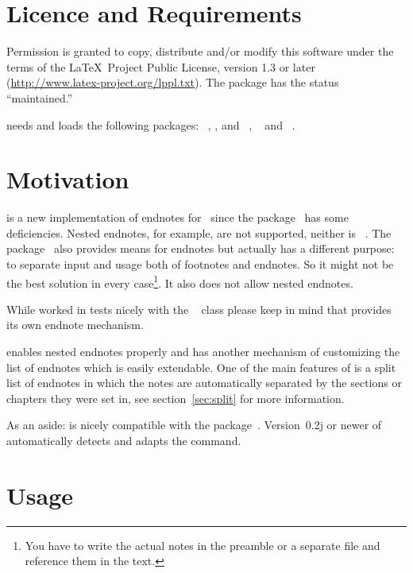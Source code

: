 \documentclass[toc=bib,toc=index]{cnpkgdoc}
\begin{document}
\section{Licence and Requirements}
Permission is granted to copy, distribute and/or modify this software under the
terms of the \LaTeX\ Project Public License, version 1.3 or later
(\url{http://www.latex-project.org/lppl.txt}). The package has the status
``maintained.''

\enotez needs and loads the following packages: ~\cite{pkg:l3kernel},
,  and ~\cite{pkg:l3packages},
~\cite{pkg:xpatch} and ~\cite{pkg:scrlfile}.

\section{Motivation}
\enotez is a new implementation of endnotes for \LaTeXe\ since the 
package~\cite{pkg:endnotes} has some deficiencies. Nested endnotes, for example, are
not supported, neither is ~\cite{pkg:hyperref}. The
 package~\cite{pkg:sepfootnotes} also provides means for endnotes
but actually has a different purpose: to separate input and usage both of
footnotes and endnotes. So it might not be the best solution in every
case\footnote{You have to write the actual notes in the preamble or a separate
file and reference them in the text.}. It also does not allow nested endnotes.

While \enotez worked in tests nicely with the ~\cite{cls:memoir}
class please keep in mind that  provides its own endnote mechanism.

\enotez enables nested endnotes properly and has another mechanism of customizing
the list of endnotes which is easily extendable. One of the main features  of
\enotez is a split list of endnotes in which the notes are automatically
separated by the sections or chapters they were set in, see section~\ref{sec:split}
for more information.

As an aside: \enotez is nicely compatible with the  package~\cite{pkg:fnpct}.
Version~0.2j or newer of  automatically detects \enotez and adapts
the  command.

\section{Usage}
\end{document}
